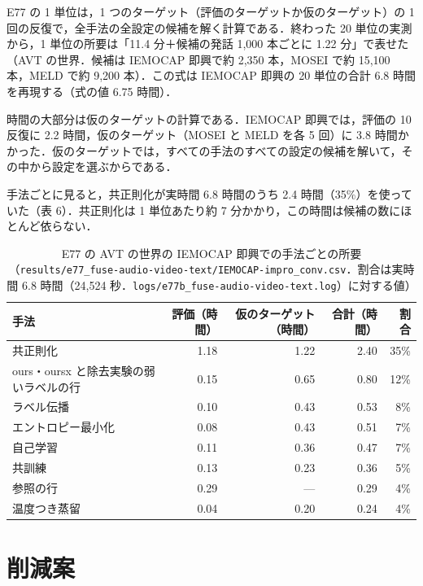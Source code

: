 E77 の 1 単位は，1 つのターゲット（評価のターゲットか仮のターゲット）の 1 回の反復で，全手法の全設定の候補を解く計算である．終わった 20 単位の実測から，1 単位の所要は「11.4 分＋候補の発話 1,000 本ごとに 1.22 分」で表せた（AVT の世界．候補は IEMOCAP 即興で約 2,350 本，MOSEI で約 15,100 本，MELD で約 9,200 本）．この式は IEMOCAP 即興の 20 単位の合計 6.8 時間を再現する（式の値 6.75 時間）．

時間の大部分は仮のターゲットの計算である．IEMOCAP 即興では，評価の 10 反復に 2.2 時間，仮のターゲット（MOSEI と MELD を各 5 回）に 3.8 時間かかった．仮のターゲットでは，すべての手法のすべての設定の候補を解いて，その中から設定を選ぶからである．

手法ごとに見ると，共正則化が実時間 6.8 時間のうち 2.4 時間（35\%）を使っていた（表 6）．共正則化は 1 単位あたり約 7 分かかり，この時間は候補の数にほとんど依らない．

\begin{table}[h]
\centering\small
\caption{E77 の AVT の世界の IEMOCAP 即興での手法ごとの所要（\texttt{results/e77\_fuse-audio-video-text/IEMOCAP-impro\_conv.csv}．割合は実時間 6.8 時間（24,524 秒．\texttt{logs/e77b\_fuse-audio-video-text.log}）に対する値）}
\begin{tabular}{@{}lrrrr@{}}
\toprule
手法 & 評価（時間） & 仮のターゲット（時間） & 合計（時間） & 割合 \\
\midrule
共正則化 & 1.18 & 1.22 & 2.40 & 35\% \\
ours・oursx と除去実験の弱いラベルの行 & 0.15 & 0.65 & 0.80 & 12\% \\
ラベル伝播 & 0.10 & 0.43 & 0.53 & 8\% \\
エントロピー最小化 & 0.08 & 0.43 & 0.51 & 7\% \\
自己学習 & 0.11 & 0.36 & 0.47 & 7\% \\
共訓練 & 0.13 & 0.23 & 0.36 & 5\% \\
参照の行 & 0.29 & — & 0.29 & 4\% \\
温度つき蒸留 & 0.04 & 0.20 & 0.24 & 4\% \\
\bottomrule
\end{tabular}
\end{table}




\section{削減案}

